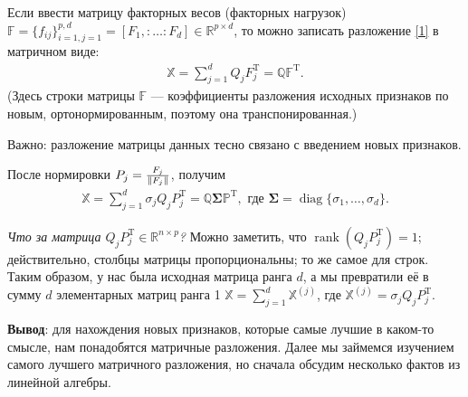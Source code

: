 \documentclass[specialist, 12pt,
subf, %
href, colorlinks=true,
substylefile = spbu.rtx,
]{disser}
\newtheorem{proposition}{Предложение}
\DeclareMathOperator{\diag}{diag}
\DeclareMathOperator{\rnk}{rank}
\begin{document}
	Если ввести матрицу факторных весов (факторных нагрузок) $\mathbb{F} = \{f_{ij}\}_{i = 1, j = 1}^{p,d}= [F_1,:\ldots:F_d] \in \mathbb{R}^{p \times d}$, то можно записать разложение \eqref{1} в матричном виде:
\begin{gather}\label{2}
\mathbb{X} = \sum\limits_{j = 1}^d Q_j F_j^{\mathrm{T}} = \mathbb{Q}\mathbb{F}^{\mathrm{T}}.
\end{gather}
(Здесь строки матрицы $\mathbb{F}$ --- коэффициенты разложения исходных признаков по новым, ортонормированным, поэтому она транспонированная.)

Важно: разложение матрицы данных тесно связано с введением новых признаков.

После нормировки $P_j = \frac{F_j}{\Arrowvert F_j\Arrowvert}$, получим
\begin{gather}\label{3}
\mathbb{X} = \sum\limits_{j = 1}^d \sigma_j Q_j P_j^{\mathrm{T}} = \mathbb{Q} \mathbf{\bm\Sigma} \mathbb{P}^{\mathrm{T}}, \text{ где $\mathbf{\bm\Sigma} = \diag\{\sigma_1, \ldots, \sigma_d\}$.}
\end{gather}

%
\textit{Что за матрица $Q_jP_j^{\mathrm{T}} \in \mathbb{R}^{n \times p}$?} Можно заметить, что $\rnk(Q_jP_j^{\mathrm{T}}) = 1$; действительно, столбцы матрицы пропорциональны; то же самое для строк. Таким образом, у нас была исходная матрица ранга $d$, а мы превратили её в сумму $d$ элементарных матриц ранга 1 $\mathbb{X} = \sum\limits_{j = 1}^d \mathbb{X}^{(j)}$, где $\mathbb{X}^{(j)} = \sigma_jQ_jP_j^{\mathrm{T}}$.

\textbf{Вывод}: для нахождения новых признаков, которые самые лучшие в каком-то смысле, нам понадобятся матричные разложения. Далее мы займемся изучением самого лучшего матричного разложения, но сначала обсудим несколько фактов из линейной алгебры.

\end{document}
